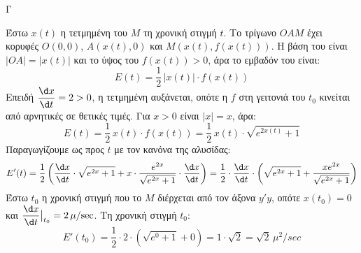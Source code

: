 \begin{thema}{Γ}
\begin{erwthma}
\item Έστω $x(t)$ η τετμημένη του $M$ τη χρονική στιγμή $t$. Το τρίγωνο $OAM$ έχει κορυφές $O(0,0)$, $A(x(t),0)$ και $M(x(t),f(x(t)))$. Η βάση του είναι $|OA|=|x(t)|$ και το ύψος του $f(x(t))>0$, άρα το εμβαδόν του είναι:
\[E(t)=\frac{1}{2}\,|x(t)|\cdot f(x(t))\]
Επειδή $\dfrac{\d x}{\d t}=2>0$, η τετμημένη αυξάνεται, οπότε η $f$ στη γειτονιά του $t_0$ κινείται από αρνητικές σε θετικές τιμές. Για $x>0$ είναι $|x|=x$, άρα:
\[E(t)=\frac{1}{2}\,x(t)\cdot f(x(t))=\frac{1}{2}\,x(t)\cdot\sqrt{e^{2x(t)}+1}\]
Παραγωγίζουμε ως προς $t$ με τον κανόνα της αλυσίδας:
\[E'(t)=\frac{1}{2}\left(\frac{\d x}{\d t}\cdot\sqrt{e^{2x}+1}+x\cdot\frac{e^{2x}}{\sqrt{e^{2x}+1}}\cdot\frac{\d x}{\d t}\right)=\frac{1}{2}\cdot\frac{\d x}{\d t}\cdot\left(\sqrt{e^{2x}+1}+\frac{xe^{2x}}{\sqrt{e^{2x}+1}}\right)\]
Έστω $t_0$ η χρονική στιγμή που το $M$ διέρχεται από τον άξονα $y'y$, οπότε $x(t_0)=0$ και $\dfrac{\d x}{\d t}\big|_{t_0}=2\,\mu/\si{sec}$. Τη χρονική στιγμή $t_0$:
\[E'(t_0)=\frac{1}{2}\cdot 2\cdot\left(\sqrt{e^{0}+1}+0\right)=1\cdot\sqrt{2}=\sqrt{2}\,\mu^2/\si{sec}\]
\end{erwthma}
\end{thema}


